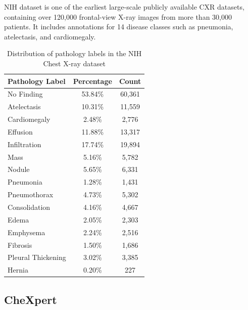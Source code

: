 NIH \cite{filice2020crowdsourcing} dataset is one of the earliest large-scale publicly available CXR datasets, containing over 120,000 
frontal-view X-ray images from more than 30,000 patients. It includes annotations for 14 disease classes such 
as pneumonia, atelectasis, and cardiomegaly.

\begin{table}[h!]
\centering
\caption{Distribution of pathology labels in the NIH Chest X-ray dataset}
\label{tab:nih_distribution}
\begin{tabular}{lcc}
\hline
\textbf{Pathology Label} & \textbf{Percentage} & \textbf{Count} \\
\hline
No Finding & 53.84\% & 60,361 \\
Atelectasis & 10.31\% & 11,559 \\
Cardiomegaly & 2.48\% & 2,776 \\
Effusion & 11.88\% & 13,317 \\
Infiltration & 17.74\% & 19,894 \\
Mass & 5.16\% & 5,782 \\
Nodule & 5.65\% & 6,331 \\
Pneumonia & 1.28\% & 1,431 \\
Pneumothorax & 4.73\% & 5,302 \\
Consolidation & 4.16\% & 4,667 \\
Edema & 2.05\% & 2,303 \\
Emphysema & 2.24\% & 2,516 \\
Fibrosis & 1.50\% & 1,686 \\
Pleural Thickening & 3.02\% & 3,385 \\
Hernia & 0.20\% & 227 \\
\hline
\end{tabular}
\end{table}


\subsection{CheXpert}

